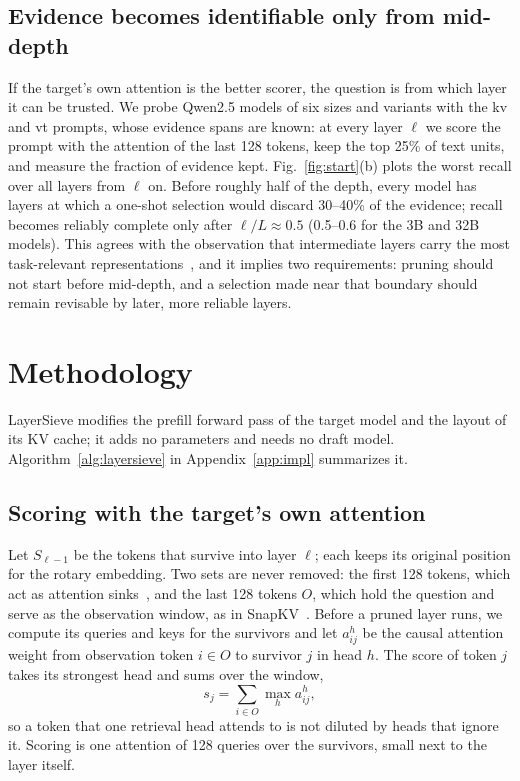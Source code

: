 \documentclass[10pt,conference]{IEEEtran}
\begin{document}
\subsection{Evidence becomes identifiable only from mid-depth}
\label{sec:obs-depth}

If the target's own attention is the better scorer, the question is from which layer it can be trusted. We probe Qwen2.5 models of six sizes and variants with the kv and vt prompts, whose evidence spans are known: at every layer $\ell$ we score the prompt with the attention of the last 128 tokens, keep the top 25\% of text units, and measure the fraction of evidence kept. Fig.~\ref{fig:start}(b) plots the worst recall over all layers from $\ell$ on. Before roughly half of the depth, every model has layers at which a one-shot selection would discard 30--40\% of the evidence; recall becomes reliably complete only after $\ell/L\approx 0.5$ (0.5--0.6 for the 3B and 32B models). This agrees with the observation that intermediate layers carry the most task-relevant representations~\cite{skean2025layerbylayer}, and it implies two requirements: pruning should not start before mid-depth, and a selection made near that boundary should remain revisable by later, more reliable layers.

\section{Methodology}
\label{sec:method}

LayerSieve modifies the prefill forward pass of the target model and the layout of its KV cache; it adds no parameters and needs no draft model. Algorithm~\ref{alg:layersieve} in Appendix~\ref{app:impl} summarizes it.

\subsection{Scoring with the target's own attention}

Let $S_{\ell-1}$ be the tokens that survive into layer $\ell$; each keeps its original position for the rotary embedding. Two sets are never removed: the first 128 tokens, which act as attention sinks~\cite{xiao2024efficient}, and the last 128 tokens $O$, which hold the question and serve as the observation window, as in SnapKV~\cite{li2024snapkv}. Before a pruned layer runs, we compute its queries and keys for the survivors and let $a^{h}_{ij}$ be the causal attention weight from observation token $i\in O$ to survivor $j$ in head $h$. The score of token $j$ takes its strongest head and sums over the window,
\begin{equation}
s_j=\sum_{i\in O}\max_{h} a^{h}_{ij},
\label{eq:score}
\end{equation}
so a token that one retrieval head attends to is not diluted by heads that ignore it. Scoring is one attention of 128 queries over the survivors, small next to the layer itself.
\end{document}
